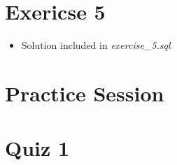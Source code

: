 \documentclass[12pt]{article}
\begin{document}
\bigskip

\section{Exericse 5}

\bigskip

\begin{itemize}
    \item Solution included in \textit{exercise\_5.sql}
\end{itemize}

\bigskip

\section{Practice Session}


\bigskip

\section{Quiz 1}

\bigskip
\end{document}
